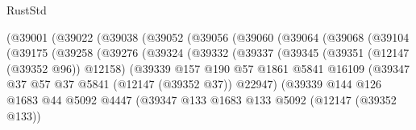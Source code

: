 \begin{lexlean}{RustStd}
\begin{coremodule}
                        (@39001
                          (@39022
                            (@39038
                              (@39052
                                (@39056
                                  (@39060
                                    (@39064
                                      (@39068
                                        (@39104
                                          (@39175
                                            (@39258
                                              (@39276
                                                (@39324
                                                  (@39332
                                                    (@39337
                                                      (@39345
                                                        (@39351 (@12147 (@39352 @96)) @12158)
                                                        (@39339
                                                          @157
                                                          @190
                                                          @57
                                                          @1861
                                                          @5841
                                                          @16109
                                                          (@39347
                                                            @37
                                                            @57
                                                            @37
                                                            @5841
                                                            (@12147 (@39352 @37))
                                                            @22947)
                                                          (@39339
                                                            @144
                                                            @126
                                                            @1683
                                                            @44
                                                            @5092
                                                            @4447
                                                            (@39347
                                                              @133
                                                              @1683
                                                              @133
                                                              @5092
                                                              (@12147 (@39352 @133))

\end{coremodule}
\end{lexlean}
